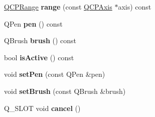 \begin{DoxyCompactItemize}
\item 
\hyperlink{class_q_c_p_range}{Q\+C\+P\+Range} {\bfseries range} (const \hyperlink{class_q_c_p_axis}{Q\+C\+P\+Axis} $\ast$axis) const \hypertarget{class_q_c_p_selection_rect_abef79a750c3469e88554fe134d0510fd}{}\label{class_q_c_p_selection_rect_abef79a750c3469e88554fe134d0510fd}

\item 
Q\+Pen {\bfseries pen} () const \hypertarget{class_q_c_p_selection_rect_a96fe01abf40bc71863ce582d843eb07c}{}\label{class_q_c_p_selection_rect_a96fe01abf40bc71863ce582d843eb07c}

\item 
Q\+Brush {\bfseries brush} () const \hypertarget{class_q_c_p_selection_rect_a3759fd762c5913fc8a0fd6aa6ff4e7ff}{}\label{class_q_c_p_selection_rect_a3759fd762c5913fc8a0fd6aa6ff4e7ff}

\item 
bool {\bfseries is\+Active} () const \hypertarget{class_q_c_p_selection_rect_a5eb64ab5638c04a952e230de3766470e}{}\label{class_q_c_p_selection_rect_a5eb64ab5638c04a952e230de3766470e}

\item 
void {\bfseries set\+Pen} (const Q\+Pen \&pen)\hypertarget{class_q_c_p_selection_rect_ada20b7fb1b2dcbe50523262636b06963}{}\label{class_q_c_p_selection_rect_ada20b7fb1b2dcbe50523262636b06963}

\item 
void {\bfseries set\+Brush} (const Q\+Brush \&brush)\hypertarget{class_q_c_p_selection_rect_ab0c66f1484418782efa01f4153611080}{}\label{class_q_c_p_selection_rect_ab0c66f1484418782efa01f4153611080}

\item 
Q\+\_\+\+S\+L\+OT void {\bfseries cancel} ()\hypertarget{class_q_c_p_selection_rect_aecab056215dc9426049ea5adc784edec}{}\label{class_q_c_p_selection_rect_aecab056215dc9426049ea5adc784edec}

\end{DoxyCompactItemize}
